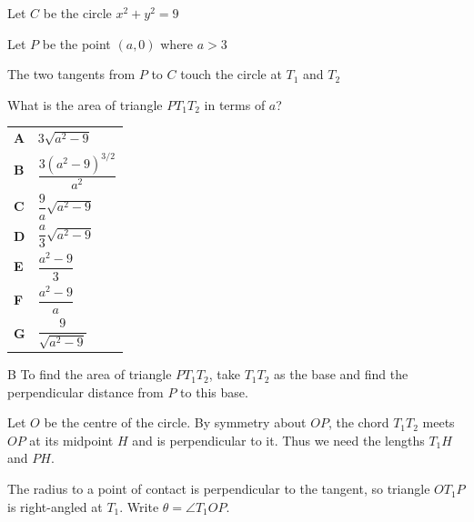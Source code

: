 \documentclass[11pt,a4paper]{article}
\begin{document}
\begin{enumerate}[label=\textbf{\arabic*.},leftmargin=*,itemsep=0pt,start=13]
\questionitem[Geometry]
Let $C$ be the circle $x^2+y^2=9$

Let $P$ be the point $(a,0)$ where $a>3$

The two tangents from $P$ to $C$ touch the circle at $T_1$ and $T_2$

What is the area of triangle $PT_1T_2$ in terms of $a$?

\par\vspace*{12pt}
\begin{tabularx}{\linewidth}{@{}>{\bfseries}l Y@{}}
A &
$3\sqrt{a^2-9}$
\\[0.8em]
B &
$\dfrac{3(a^2-9)^{3/2}}{a^2}$
\\[0.8em]
C &
$\dfrac{9}{a}\sqrt{a^2-9}$
\\[0.8em]
D &
$\dfrac{a}{3}\sqrt{a^2-9}$
\\[0.8em]
E &
$\dfrac{a^2-9}{3}$
\\[0.8em]
F &
$\dfrac{a^2-9}{a}$
\\[0.8em]
G &
$\dfrac{9}{\sqrt{a^2-9}}$
\\
\end{tabularx}

\begin{djsSolution}{B}
To find the area of triangle $PT_1T_2$, take $T_1T_2$ as the base and find the perpendicular distance from $P$ to this base.

Let $O$ be the centre of the circle. By symmetry about $OP$, the chord $T_1T_2$ meets $OP$ at its midpoint $H$ and is perpendicular to it. Thus we need the lengths $T_1H$ and $PH$.

The radius to a point of contact is perpendicular to the tangent, so triangle $OT_1P$ is right-angled at $T_1$. Write $\theta=\angle T_1OP$.

\begin{djsSolutionFigure}
\end{djsSolutionFigure}
\end{djsSolution}
\end{enumerate}
\end{document}
